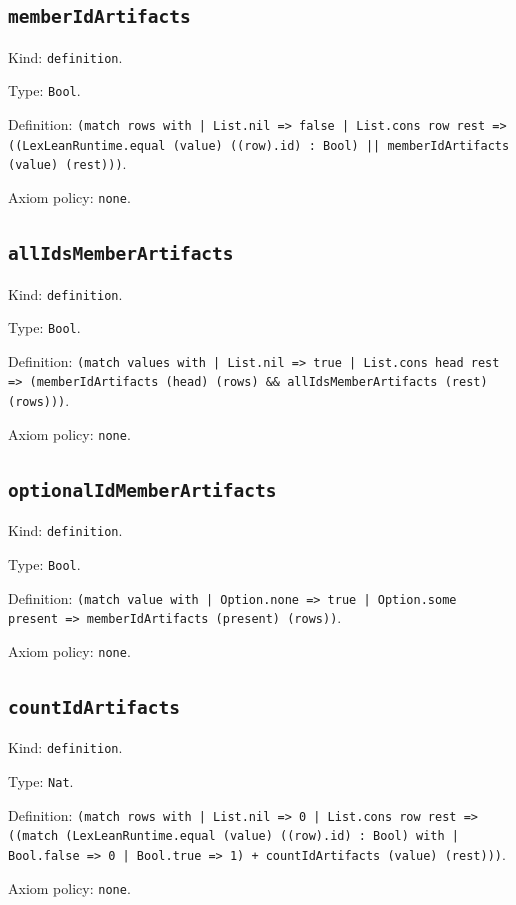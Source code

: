 \documentclass[11pt]{article}
\begin{document}
\subsection*{\texttt{memberIdArtifacts}}
\noindent Kind: \texttt{definition}.\par
\noindent Type: \texttt{Bool}.\par
\noindent Definition: \texttt{(match rows with | List.nil => false | List.cons row rest => ((LexLeanRuntime.equal (value) ((row).id) : Bool) || memberIdArtifacts (value) (rest)))}.\par
\noindent Axiom policy: \texttt{none}.\par
\subsection*{\texttt{allIdsMemberArtifacts}}
\noindent Kind: \texttt{definition}.\par
\noindent Type: \texttt{Bool}.\par
\noindent Definition: \texttt{(match values with | List.nil => true | List.cons head rest => (memberIdArtifacts (head) (rows) \&\& allIdsMemberArtifacts (rest) (rows)))}.\par
\noindent Axiom policy: \texttt{none}.\par
\subsection*{\texttt{optionalIdMemberArtifacts}}
\noindent Kind: \texttt{definition}.\par
\noindent Type: \texttt{Bool}.\par
\noindent Definition: \texttt{(match value with | Option.none => true | Option.some present => memberIdArtifacts (present) (rows))}.\par
\noindent Axiom policy: \texttt{none}.\par
\subsection*{\texttt{countIdArtifacts}}
\noindent Kind: \texttt{definition}.\par
\noindent Type: \texttt{Nat}.\par
\noindent Definition: \texttt{(match rows with | List.nil => 0 | List.cons row rest => ((match (LexLeanRuntime.equal (value) ((row).id) : Bool) with | Bool.false => 0 | Bool.true => 1) + countIdArtifacts (value) (rest)))}.\par
\noindent Axiom policy: \texttt{none}.\par
\end{document}
